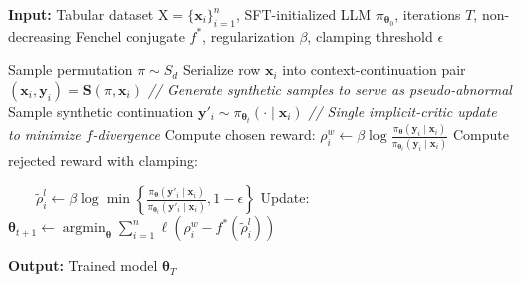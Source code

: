 \begin{algorithm}[t]
\caption{DiSPaT}
\label{alg:dispat}
\textbf{Input:} Tabular dataset $\mathrm{X} = \{\mathbf{x}_i\}_{i=1}^{n}$, SFT-initialized LLM $\pi_{\boldsymbol{\theta}_0}$, iterations $T$, non-decreasing Fenchel conjugate $f^*$, regularization $\beta$, clamping threshold $\epsilon$

\begin{algorithmic}[1]
    \STATE Sample permutation $\pi \sim S_d$
    \STATE Serialize row $\mathbf{x}_i$ into context-continuation pair $(\mathbf{x}_i, \mathbf{y}_i) = \mathbf{S}(\pi, \mathbf{x}_i)$
\ENDFOR
{}
    \STATE \textit{// Generate synthetic samples to serve as pseudo-abnormal}
        \STATE Sample synthetic continuation $\mathbf{y}'_i \sim \pi_{\boldsymbol{\theta}_t}(\cdot \mid \mathbf{x}_i)$
    \ENDFOR
    \STATE \textit{// Single implicit-critic update to minimize $f$-divergence}
    \STATE Compute chosen reward: $\rho^{w}_i \gets \beta \log \frac{\pi_{\boldsymbol{\theta}}(\mathbf{y}_i \mid \mathbf{x}_i)}{\pi_{\boldsymbol{\theta}_t}(\mathbf{y}_i \mid \mathbf{x}_i)}$
    \STATE Compute rejected reward with clamping:
    \item[] $\quad \quad \displaystyle \tilde{\rho}^{l}_i \gets \beta \log \min\left\{\frac{\pi_{\boldsymbol{\theta}}(\mathbf{y}'_i \mid \mathbf{x}_i)}{\pi_{\boldsymbol{\theta}_t}(\mathbf{y}'_i \mid \mathbf{x}_i)}, 1 - \epsilon\right\}$
    \STATE Update: $\boldsymbol{\theta}_{t+1} \gets \operatorname*{argmin}_{\boldsymbol{\theta}} \sum_{i=1}^{n} \ell \left( \rho_i^w - f^*(\tilde{\rho}_i^l) \right)$
\ENDFOR
\end{algorithmic}
\textbf{Output:} Trained model $\boldsymbol{\theta}_T$
\end{algorithm}
